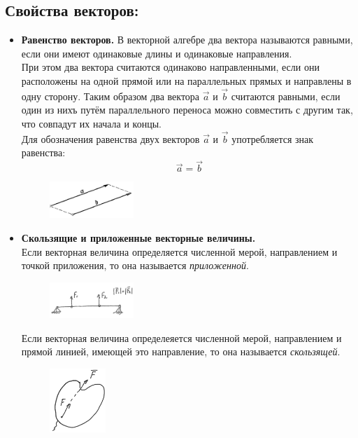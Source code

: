 \documentclass{article}
\begin{document}
\subsection{Свойства векторов:}
\begin{itemize}
  \item \textbf{Равенство векторов.} В векторной алгебре два вектора называются равными, если они имеют одинаковые длины и одинаковые направления. \\ При этом два вектора считаются одинаково направленными, если они расположены на одной прямой или на параллельных прямых и направлены в одну сторону. Таким образом два вектора $\vec{a}$ и $\vec{b}$ считаются равными, если один из нихъ путём параллельного переноса можно совместить с другим так, что совпадут их начала и концы. \\ Для обозначения равенства двух векторов $\vec{a}$ и $\vec{b}$ употребляется знак равенства: $$\vec{a} = \vec{b}$$
    \begin{figure}[h]
        \centering
        \includegraphics[width=0.3\textwidth]{image1_2.png}
    \end{figure}
  \item \textbf{Скользящие и приложенные векторные величины.} \\
  Если векторная величина определяется численной мерой, направлением и точкой приложения, то она называется \textit{приложенной}. \\
      \begin{figure}[H]
        \centering
        \includegraphics[width=0.3\textwidth]{image1_3.png}
    \end{figure}
  Если векторная величина определеяется численной мерой, направлением и прямой линией, имеющей это направление, то она называется \textit{скользящей}. \\
      \begin{figure}[H]
        \centering
        \includegraphics[width=0.2\textwidth]{image1_4.png}

\end{figure}
\end{itemize}
\end{document}

